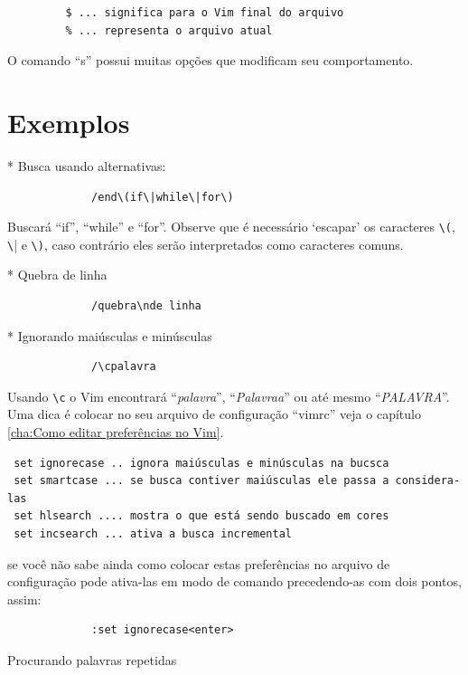 \documentclass[10pt,a4paper,openany]{book}
\begin{document}
\begin{verbatim}
		 $ ... significa para o Vim final do arquivo
		 % ... representa o arquivo atual
\end{verbatim}

O comando ``s'' possui muitas opções que modificam seu comportamento.

\section{Exemplos }
\label{Exemplos }

* Busca usando alternativas:

\begin{verbatim}
			 /end\(if\|while\|for\)
\end{verbatim}

Buscará ``if'', ``while'' e ``for''.  Observe que é necessário `escapar' os
caracteres \verb|\(|, \verb|\|| e \verb|\)|, caso contrário eles serão
interpretados como caracteres comuns.

* Quebra de linha

\begin{verbatim}
			 /quebra\nde linha
\end{verbatim}

* Ignorando maiúsculas e minúsculas

\begin{verbatim}
			 /\cpalavra
\end{verbatim}

Usando \verb|\c| o Vim encontrará ``{\em{palavra}}'', ``{\em{Palavraa}}'' ou
até mesmo ``{\em{PALAVRA}}''. Uma dica é colocar no seu arquivo de
configuração ``vimrc'' veja o capítulo \ref{cha:Como editar preferências no Vim}.

\begin{verbatim}
 set ignorecase .. ignora maiúsculas e minúsculas na bucsca
 set smartcase ... se busca contiver maiúsculas ele passa a considera-las
 set hlsearch .... mostra o que está sendo buscado em cores
 set incsearch ... ativa a busca incremental
\end{verbatim}

se você não sabe ainda como colocar estas preferências no arquivo de configuração pode
ativa-las em modo de comando precedendo-as com dois pontos, assim:

\begin{verbatim}
			 :set ignorecase<enter>
\end{verbatim}

Procurando palavras repetidas
\end{document}
